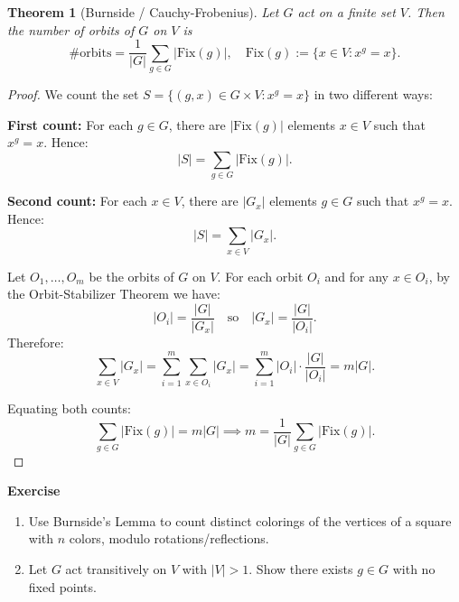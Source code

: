 \documentclass[12pt,a4paper,openany]{book}
\newtheorem{theorem}{Theorem}[section]
\begin{document}
\begin{theorem}[Burnside / Cauchy-Frobenius]\label{thm:burnside}
Let $G$ act on a finite set $V$. Then the number of orbits of $G$ on $V$ is
\[
\#\text{orbits} = \frac{1}{|G|} \sum_{g \in G} |\mathrm{Fix}(g)|, \quad \mathrm{Fix}(g) := \{ x \in V : x^g = x\}.
\]
\end{theorem}

\begin{proof}
We count the set $S = \{ (g,x) \in G \times V : x^g = x \}$ in two different ways:

\textbf{First count:} For each $g \in G$, there are $|\mathrm{Fix}(g)|$ elements $x \in V$ such that $x^g = x$. Hence:
\[
|S| = \sum_{g \in G} |\mathrm{Fix}(g)|.
\]

\textbf{Second count:} For each $x \in V$, there are $|G_x|$ elements $g \in G$ such that $x^g = x$. Hence:
\[
|S| = \sum_{x \in V} |G_x|.
\]

Let $O_1, \dots, O_m$ be the orbits of $G$ on $V$. For each orbit $O_i$ and for any $x \in O_i$, by the Orbit-Stabilizer Theorem we have:
\[
|O_i| = \frac{|G|}{|G_x|} \quad \text{so} \quad |G_x| = \frac{|G|}{|O_i|}.
\]
Therefore:
\[
\sum_{x \in V} |G_x| = \sum_{i=1}^m \sum_{x \in O_i} |G_x| = \sum_{i=1}^m |O_i| \cdot \frac{|G|}{|O_i|} = m |G|.
\]

Equating both counts:
\[
\sum_{g \in G} |\mathrm{Fix}(g)| = m |G| \implies m = \frac{1}{|G|} \sum_{g \in G} |\mathrm{Fix}(g)|.
\]
\end{proof}

\bigskip\noindent\textbf{Exercise}\label{ex:burnside-applications}
\begin{enumerate}
\item Use Burnside's Lemma to count distinct colorings of the vertices of a square with $n$ colors, modulo rotations/reflections.
\item Let $G$ act transitively on $V$ with $|V|>1$. Show there exists $g \in G$ with no fixed points.
\end{enumerate}
\end{document}
